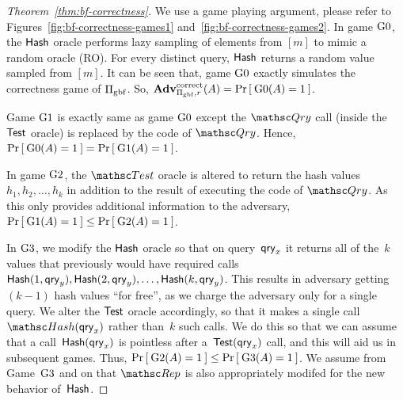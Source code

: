 \begin{proof}[Theorem~\ref{thm:bf-correctness}]
We use a game playing argument, please refer to Figures~\ref{fig:bf-correctness-games1} and~\ref{fig:bf-correctness-games2}. In game $\text{G0}$, the $\mathsf{Hash}$ oracle performs lazy sampling of elements from $[m]$ to mimic a random oracle (RO). For every distinct query, $\mathsf{Hash}$ returns a random value sampled from $[m]$. It can be seen that, game $\text{G0}$ exactly simulates the correctness game of $\Pi_{\mathrm{gbf}}$.  So, $\mathrm{\mathbf{Adv}}^{\mathrm{correct}}_{\Pi_{\mathrm{gbf}},r}(A) = \Pr\left[\: \text{G0}(A) = 1 \:\right]$.

Game $\text{G1}$ is exactly same as game $\text{G0}$ except the $\Qry$ call (inside the $\mathsf{Test}$ oracle) is replaced by the code of $\Qry$.  Hence, $\Pr\left[\: \text{G0}(A) = 1 \:\right] = \Pr\left[\: \text{G1}(A) = 1 \:\right]$.

In game $\text{G2}$, the $\Test$ oracle is altered to return the hash values~$h_1,h_2,\ldots, h_k$ in addition to the result of executing the code of $\Qry$.  As this only provides additional information to the adversary, $\Pr\left[\: \text{G1}(A) = 1 \:\right] \leq \Pr\left[\: \text{G2}(A) = 1 \:\right]$.

In $\text{G3}$, we modify the $\mathsf{Hash}$ oracle so that on query~$\mathsf{qry}_x$ it returns all of the~$k$ values that previously would have required calls $\HashOracle(1,\qry_y),\HashOracle(2,\qry_y),\ldots,\linebreak\HashOracle(k,\qry_y)$.  This results in adversary getting $(k-1)$ hash values ``for free'', as we charge the adversary only for a single query.  We alter the $\mathsf{Test}$ oracle accordingly, so that it makes a single call $\Hash(\qry_x)$ rather than~$k$ such calls.  We do this so that we can assume that a call~$\mathsf{Hash}(\mathsf{qry}_x)$ is pointless after a~$\mathsf{Test}(\mathsf{qry}_x)$ call, and this will aid us in subsequent games.   Thus, $\Pr\left[\: \text{G2}(A) = 1 \:\right] \leq \Pr\left[\: \text{G3}(A) = 1 \:\right]$.  We assume from Game~$\text{G3}$ and on that $\Rep$ is also appropriately modifed for the new behavior of~$\mathsf{Hash}$.


\end{proof}
